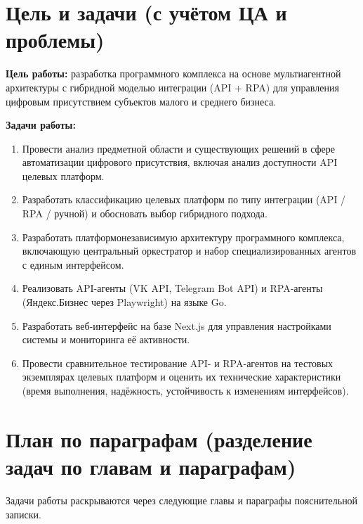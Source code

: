 \documentclass[12pt]{G7-32}
\begin{document}
\chapter{Цель и задачи (с учётом ЦА и проблемы)}
\label{ch:goals}

\textbf{Цель работы:} разработка программного комплекса на основе мультиагентной архитектуры с гибридной моделью интеграции (API + RPA) для управления цифровым присутствием субъектов малого и среднего бизнеса.

\textbf{Задачи работы:}

\begin{enumerate}
  \item Провести анализ предметной области и существующих решений в сфере автоматизации цифрового присутствия, включая анализ доступности API целевых платформ.
  \item Разработать классификацию целевых платформ по типу интеграции (API / RPA / ручной) и обосновать выбор гибридного подхода.
  \item Разработать платформонезависимую архитектуру программного комплекса, включающую центральный оркестратор и набор специализированных агентов с единым интерфейсом.
  \item Реализовать API-агенты (VK API, Telegram Bot API) и RPA-агенты (Яндекс.Бизнес через Playwright) на языке Go.
  \item Разработать веб-интерфейс на базе Next.js для управления настройками системы и мониторинга её активности.
  \item Провести сравнительное тестирование API- и RPA-агентов на тестовых экземплярах целевых платформ и оценить их технические характеристики (время выполнения, надёжность, устойчивость к изменениям интерфейсов).
\end{enumerate}

\chapter{План по параграфам (разделение задач по главам и параграфам)}
\label{ch:plan}

Задачи работы раскрываются через следующие главы и параграфы пояснительной записки.
\end{document}
